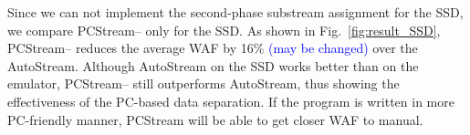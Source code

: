 Since we can not implement the second-phase substream assignment
for the SSD, we compare {\sf PCStream--} only for the SSD.
As shown in Fig.~\ref{fig:result_SSD}, 
{\sf PCStream--} reduces the average WAF by 16\% 
\textcolor{blue}{(may be changed)} over the AutoStream. 
Although AutoStream on the SSD works better than on the emulator,
{\sf PCStream--} still outperforms AutoStream,
thus showing the effectiveness of the PC-based 
data separation.
If the program is written in more PC-friendly manner, 
{\sf PCStream} will be able to get closer WAF to manual.
